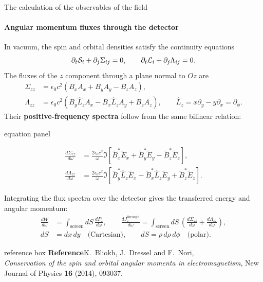 \documentclass[aspectratio=169, 10pt]{beamer}
\newcommand{\theorylabel}[1]{{\color{ValidationTeal}\textbf{#1}}}
\newenvironment{equationpanel}{%
  \par
  \begin{beamercolorbox}[wd=\linewidth,sep=0pt]{equation panel}%
  }{%
  \end{beamercolorbox}%
}
\begin{document}
\begin{frame}{The calculation of the observables of the field}
  \framesubtitle{Angular momentum fluxes through the detector}
  \setlength{\abovedisplayskip}{2pt}
  \setlength{\belowdisplayskip}{2pt}
  In vacuum, the spin and orbital densities satisfy the continuity equations
  \begin{align*}
    \partial_t{\cal S}_i+\partial_j\Sigma_{ij}=0,\qquad
    \partial_t{\cal L}_i+\partial_j\Lambda_{ij}=0.
  \end{align*}
  The fluxes of the $z$ component through a plane normal to $Oz$ are
  \begin{align*}
    \Sigma_{zz}&=\epsilon_0c^2(B_xA_x+B_yA_y-B_zA_z),\\
    \Lambda_{zz}&=\epsilon_0c^2(B_y\hat L_z A_x-B_x\hat L_z A_y+B_zA_z),
    \qquad\hat L_z=x\partial_y-y\partial_x=\partial_\phi.
  \end{align*}
  Their \theorylabel{positive-frequency spectra} follow from the same bilinear relation:
  \begin{equationpanel}
    \begin{align*}
      \frac{d\Sigma_{zz}}{d\omega}
      &=\frac{2\epsilon_0c^2}{\omega}\Im\left[
      \tilde B_x^*\tilde E_x+\tilde B_y^*\tilde E_y-\tilde B_z^*\tilde E_z\right],\\
      \frac{d\Lambda_{zz}}{d\omega}
      &=\frac{2\epsilon_0c^2}{\omega}\Im\left[
        \tilde B_y^*\hat L_z\tilde E_x-\tilde B_x^*\hat L_z\tilde E_y
      +\tilde B_z^*\tilde E_z\right].
    \end{align*}
  \end{equationpanel}
  Integrating the flux spectra over the detector gives the transferred energy and angular momentum:
  \begin{align*}
    \frac{dW}{d\omega}&=\int_{\mathrm{screen}}dS\,
    \frac{d P_z}{d\omega},\qquad
    \frac{dJ_z^{\mathrm{through}}}{d\omega}=\int_{\mathrm{screen}}dS\,
    \left(\frac{d\Sigma_{zz}}{d\omega}
    +\frac{d\Lambda_{zz}}{d\omega}\right),\\
    dS&=dx\,dy\quad\text{(Cartesian)},\qquad
    dS=\rho\,d\rho\,d\phi\quad\text{(polar)}.
  \end{align*}

  \begingroup
  \begin{beamercolorbox}[wd=\linewidth,sep=2pt]{reference box}
    \tiny\textbf{Reference}\enspace K.~Bliokh, J.~Dressel and F.~Nori,\\
    \textit{Conservation of the spin and orbital angular momenta in electromagnetism},
    New Journal of Physics \textbf{16} (2014), 093037.
  \end{beamercolorbox}
  \endgroup
\end{frame}
\end{document}
